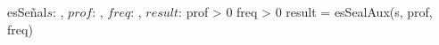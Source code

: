 \documentclass{article}
\begin{document}
\begin{proc}{esSeñal}{\In $s$: \TLista{\ent},
    \In $prof$: \ent,
    \In $freq$: \ent,
    \Out $result$: \bool}{}{
        \pre
        {
            prof > 0 \wedge freq > 0 
        }
    }{
        \post
        { 
            result = \True \Iff esSealAux(s, prof, freq) 
        }
    }

\end{proc}
\end{document}
